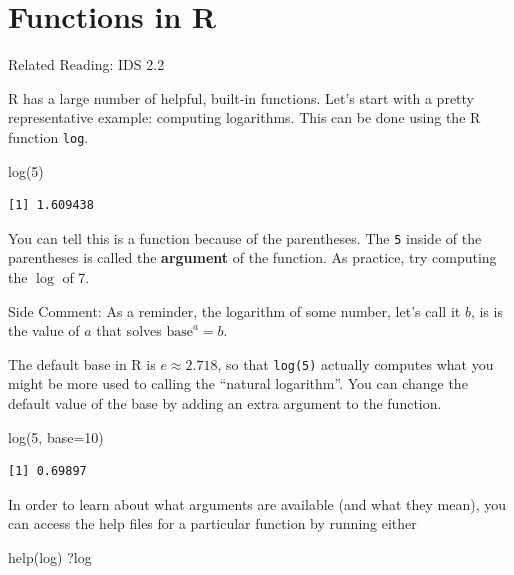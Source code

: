 \documentclass[
  letterpaper,
  DIV=11,
  numbers=noendperiod]{scrreprt}
\newenvironment{Shaded}{\begin{snugshade}}{\end{snugshade}}
\newcommand{\AttributeTok}[1]{\textcolor[rgb]{0.40,0.45,0.13}{#1}}
\newcommand{\DecValTok}[1]{\textcolor[rgb]{0.68,0.00,0.00}{#1}}
\newcommand{\FunctionTok}[1]{\textcolor[rgb]{0.28,0.35,0.67}{#1}}
\newcommand{\NormalTok}[1]{\textcolor[rgb]{0.00,0.23,0.31}{#1}}
\begin{document}
\section{Functions in R}\label{functions-in-r}

Related Reading: IDS 2.2

R has a large number of helpful, built-in functions. Let's start with a
pretty representative example: computing logarithms. This can be done
using the R function \texttt{log}.

\begin{Shaded}
\begin{Highlighting}[]
\FunctionTok{log}\NormalTok{(}\DecValTok{5}\NormalTok{)}
\end{Highlighting}
\end{Shaded}

\begin{verbatim}
[1] 1.609438
\end{verbatim}

You can tell this is a function because of the parentheses. The
\texttt{5} inside of the parentheses is called the \textbf{argument} of
the function. As practice, try computing the \(\log\) of 7.

{Side Comment:} As a reminder, the logarithm of some number, let's call
it \(b\), is is the value of \(a\) that solves \(\textrm{base}^a = b\).

The default base in R is \(e \approx 2.718\), so that \texttt{log(5)}
actually computes what you might be more used to calling the ``natural
logarithm''. You can change the default value of the base by adding an
extra argument to the function.

\begin{Shaded}
\begin{Highlighting}[]
\FunctionTok{log}\NormalTok{(}\DecValTok{5}\NormalTok{, }\AttributeTok{base=}\DecValTok{10}\NormalTok{)}
\end{Highlighting}
\end{Shaded}

\begin{verbatim}
[1] 0.69897
\end{verbatim}

In order to learn about what arguments are available (and what they
mean), you can access the help files for a particular function by
running either

\begin{Shaded}
\begin{Highlighting}[]
\FunctionTok{help}\NormalTok{(log)}
\NormalTok{?log}
\end{Highlighting}
\end{Shaded}
\end{document}

